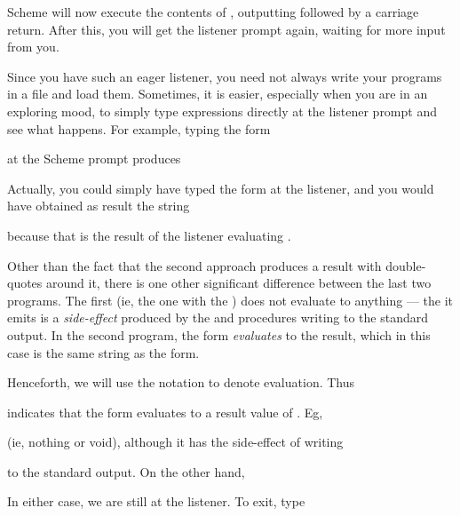 
\n Scheme will now execute the contents of
, outputting  followed
by a carriage return.  After this, you will get the listener
prompt again, waiting for more input from you.

Since you have such an eager listener, you need not
always write your programs in a file and load them.
Sometimes, it is easier, especially when you are in an
exploring mood, to simply type expressions directly at
the listener prompt and see what happens.  For example,
typing the form


\n at the Scheme prompt produces


Actually, you could simply have typed the form
 at the listener, and you would have
obtained as result the string


\n because that is the result of the listener evaluating
.

Other than the fact that the second approach produces a
result with double-quotes around it, there is one other
significant difference between the last two programs.
The first (ie, the one with the ) does not evaluate
to anything --- the  it emits is a
{\em side-effect} produced by the  and
 procedures writing to the standard output.
In the second program, the form
 {\em evaluates} to the result, which
in this case is the same string as the form.

Henceforth, we will use the notation  to denote
evaluation.  Thus


\n indicates that the form  evaluates to a result value
of .  Eg,


\n (ie, nothing or void), although it has the side-effect of writing


\n to the standard output.
On the other hand,


\n In either case, we are still at the listener.  To exit,
type

